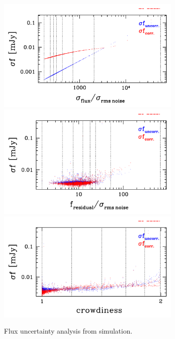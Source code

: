 \documentclass[11pt,a4paper]{article}
\begin{document}
\begin{figure}[H]
	\includegraphics[width=0.8\textwidth]{galsim_20cm_dfcorr_1}
	\includegraphics[width=0.8\textwidth]{galsim_20cm_dfcorr_2}
	\includegraphics[width=0.8\textwidth]{galsim_20cm_dfcorr_3}
	\caption{Flux uncertainty analysis from simulation.}
\end{figure}
\end{document}
